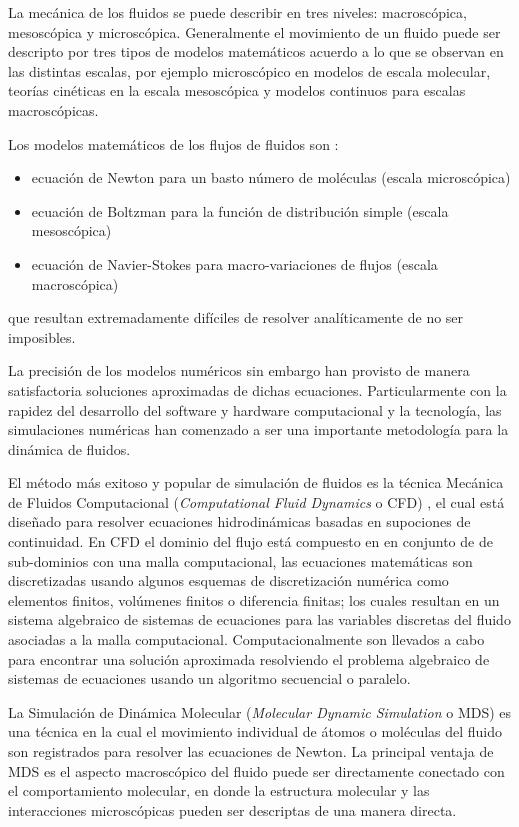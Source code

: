 La mecánica de los fluidos se puede describir en tres niveles: macroscópica, mesoscópica y microscópica.
Generalmente el movimiento de un fluido puede ser descripto por tres tipos de modelos matemáticos acuerdo a lo que se observan en las distintas escalas, por ejemplo microscópico en modelos de escala molecular, teorías cinéticas en la escala mesoscópica y modelos continuos para escalas macroscópicas.


Los modelos matemáticos de los flujos de fluidos son :

\begin{itemize}
	\item ecuación de Newton para un basto número de moléculas (escala microscópica)
	\item ecuación de Boltzman para la función de distribución simple (escala mesoscópica)
	\item ecuación de Navier-Stokes para macro-variaciones de flujos (escala macroscópica)
\end{itemize}

que resultan extremadamente difíciles de resolver analíticamente de no ser imposibles.

La precisión de los modelos numéricos sin embargo han provisto de manera satisfactoria soluciones aproximadas de dichas ecuaciones.
Particularmente con la rapidez del desarrollo del software y hardware computacional y la tecnología, las simulaciones numéricas han comenzado a ser una importante metodología para la dinámica de fluidos.

El método más exitoso y popular de simulación de fluidos es la técnica Mecánica de Fluidos Computacional (\textit{Computational Fluid Dynamics} o CFD) , el cual está diseñado para resolver ecuaciones hidrodinámicas basadas en supociones de continuidad.
En CFD el dominio del flujo está compuesto en en conjunto de de sub-dominios con una malla computacional, las ecuaciones matemáticas son discretizadas usando algunos esquemas de discretización numérica como elementos finitos, volúmenes finitos o diferencia finitas; los cuales resultan en un sistema algebraico de sistemas de ecuaciones para las variables discretas del fluido asociadas a la malla computacional. 
Computacionalmente son llevados a cabo para encontrar una solución aproximada resolviendo el problema algebraico de sistemas de ecuaciones usando un algoritmo secuencial o paralelo.
 
La Simulación de Dinámica Molecular (\textit{Molecular Dynamic Simulation} o MDS) es una técnica en la cual el movimiento individual de átomos o moléculas del fluido son registrados para resolver las ecuaciones de Newton.
La principal ventaja de MDS es el aspecto macroscópico del fluido puede ser directamente conectado con el comportamiento molecular, en donde la estructura molecular y las interacciones microscópicas pueden ser descriptas de una manera directa.


